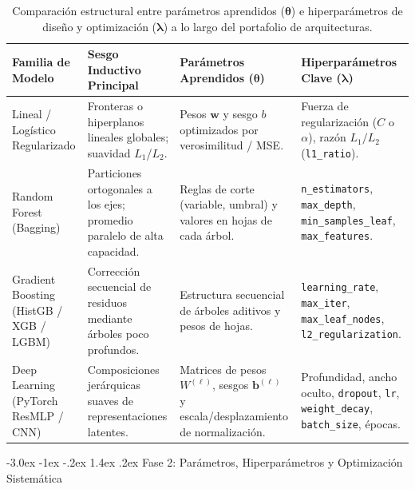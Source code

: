 \documentclass[11pt,a4paper]{article}
\makeatletter
\renewcommand\section{\@startsection{section}{1}{\z@}%
  {-3.0ex \@plus -1ex \@minus -.2ex}%
  {1.4ex \@plus .2ex}%
  {\color{NavyMain}\normalfont\Large\bfseries}}
\newcommand{\secrule}{\vspace{-0.55em}\noindent{\color{NavyMain}\rule{\textwidth}{0.6pt}}\par\vspace{0.45em}}
\makeatother
\begin{document}
\begin{table}[htbp]
\centering\small
\renewcommand{\arraystretch}{1.25}
\begin{tabularx}{\textwidth}{>{\raggedright\arraybackslash}p{3.0cm} >{\raggedright\arraybackslash}p{3.5cm} >{\raggedright\arraybackslash}p{3.5cm} >{\raggedright\arraybackslash}X}
\toprule
\textbf{Familia de Modelo} & \textbf{Sesgo Inductivo Principal} & \textbf{Parámetros Aprendidos ($\bm{\theta}$)} & \textbf{Hiperparámetros Clave ($\bm{\lambda}$)} \\
\midrule
Lineal / Logístico Regularizado & Fronteras o hiperplanos lineales globales; suavidad $L_1$/$L_2$. & Pesos $\mathbf{w}$ y sesgo $b$ optimizados por verosimilitud / MSE. & Fuerza de regularización ($C$ o $\alpha$), razón $L_1/L_2$ (\texttt{l1\_ratio}). \\
\midrule
Random Forest (Bagging) & Particiones ortogonales a los ejes; promedio paralelo de alta capacidad. & Reglas de corte (variable, umbral) y valores en hojas de cada árbol. & \texttt{n\_estimators}, \texttt{max\_depth}, \texttt{min\_samples\_leaf}, \texttt{max\_features}. \\
\midrule
Gradient Boosting (HistGB / XGB / LGBM) & Corrección secuencial de residuos mediante árboles poco profundos. & Estructura secuencial de árboles aditivos y pesos de hojas. & \texttt{learning\_rate}, \texttt{max\_iter}, \texttt{max\_leaf\_nodes}, \texttt{l2\_regularization}. \\
\midrule
Deep Learning (PyTorch ResMLP / CNN) & Composiciones jerárquicas suaves de representaciones latentes. & Matrices de pesos $W^{(\ell)}$, sesgos $\mathbf{b}^{(\ell)}$ y escala/desplazamiento de normalización. & Profundidad, ancho oculto, \texttt{dropout}, \texttt{lr}, \texttt{weight\_decay}, \texttt{batch\_size}, épocas. \\
\bottomrule
\end{tabularx}
\caption{Comparación estructural entre parámetros aprendidos ($\bm{\theta}$) e hiperparámetros de diseño y optimización ($\bm{\lambda}$) a lo largo del portafolio de arquitecturas.}
\label{tab:familias}
\end{table}

\section{Fase 2: Parámetros, Hiperparámetros y Optimización Sistemática}
\label{sec:tuning}
\secrule
\end{document}
